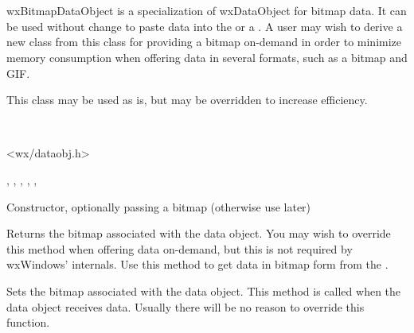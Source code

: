 \section{}\label{wxbitmapdataobject}

wxBitmapDataObject is a specialization of wxDataObject for bitmap data. It can
be used without change to paste data into the 
 or a . A
user may wish to derive a new class from this class for providing a bitmap
on-demand in order to minimize memory consumption when offering data in several
formats, such as a bitmap and GIF.


This class may be used as is, but 
 may be overridden to increase
efficiency.


\\


<wx/dataobj.h>


, 
, 
, 
, 
, 


Constructor, optionally passing a bitmap (otherwise use 
 later)

\label{wxbitmapdataobjectgetbitmap}


Returns the bitmap associated with the data object. You may wish to override
this method when offering data on-demand, but this is not required by
wxWindows' internals. Use this method to get data in bitmap form from
the .

\label{wxbitmapdataobjectsetbitmap}


Sets the bitmap associated with the data object. This method is called when the
data object receives data. Usually there will be no reason to override this
function.

